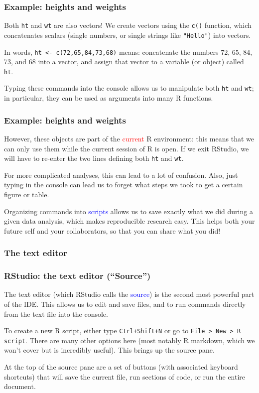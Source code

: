 \documentclass[11pt]{beamer}
\newcommand{\myframe}[1]{\begin{frame} \frametitle{#1}}
\begin{document}
\myframe{Example: heights and weights}
Both \texttt{ht} and \texttt{wt} are also vectors! We create vectors using the \texttt{c()} function, which concatenates scalars (single numbers, or single strings like \texttt{"Hello"}) into vectors.

In words, \texttt{ht <- c(72,65,84,73,68)} means: concatenate the numbers 72, 65, 84, 73, and 68 into a vector, and assign that vector to a variable (or object) called \texttt{ht}.

Typing these commands into the console allows us to manipulate both \texttt{ht} and \texttt{wt}; in particular, they can be used as arguments into many R functions.
\end{frame}

\myframe{Example: heights and weights}
However, these objects are part of the \textcolor{red}{current} R environment: this means that we can only use them while the current session of R is open. If we exit RStudio, we will have to re-enter the two lines defining both \texttt{ht} and \texttt{wt}.

For more complicated analyses, this can lead to a lot of confusion. Also, just typing in the console can lead us to forget what steps we took to get a certain figure or table.

Organizing commands into \textcolor{blue}{scripts} allows us to save exactly what we did during a given data analysis, which makes reproducible research easy. This helps both your future self and your collaborators, so that you can share what you did!
\end{frame}

\subsubsection{The text editor}
\myframe{RStudio: the text editor (``Source'')}
The text editor (which RStudio calls the \textcolor{blue}{source}) is the second most powerful part of the IDE. This allows us to edit and save files, and to run commands directly from the text file into the console.

To create a new R script, either type \texttt{Ctrl+Shift+N} or go to \texttt{File > New > R script}. There are many other options here (most notably R markdown, which we won't cover but is incredibly useful). This brings up the source pane.

At the top of the source pane are a set of buttons (with associated keyboard shortcuts) that will save the current file, run sections of code, or run the entire document. 
\end{frame}
\end{document}
